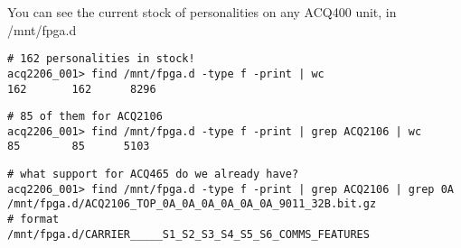 \documentclass[]{article}
\begin{document}
You can see the current stock of personalities on any ACQ400 unit, in /mnt/fpga.d

\begin{lstlisting}[style=bashstyle,frame=single]
# 162 personalities in stock!
acq2206_001> find /mnt/fpga.d -type f -print | wc
162       162      8296
\end{lstlisting}

\begin{lstlisting}[style=bashstyle,frame=single]
# 85 of them for ACQ2106
acq2206_001> find /mnt/fpga.d -type f -print | grep ACQ2106 | wc
85        85      5103
\end{lstlisting}

\begin{lstlisting}[style=bashstyle,frame=single]
# what support for ACQ465 do we already have?
acq2206_001> find /mnt/fpga.d -type f -print | grep ACQ2106 | grep 0A
/mnt/fpga.d/ACQ2106_TOP_0A_0A_0A_0A_0A_0A_9011_32B.bit.gz
# format
/mnt/fpga.d/CARRIER_____S1_S2_S3_S4_S5_S6_COMMS_FEATURES
\end{lstlisting}
\end{document}
